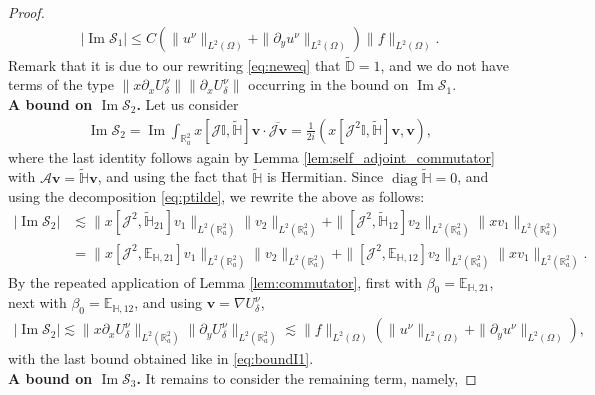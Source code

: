 \documentclass[10pt,a4paper]{amsart}
\renewcommand{\Im}{\operatorname{Im}}
\renewcommand{\vec}[1]{\mathbf{#1}}
\begin{document}
\begin{proof}
\begin{align}
	\label{eq:boundI1}
	\left|\Im \mathcal{S}_1\right|\leq C (\|u^{\nu}\|_{L^2(\Omega)}+\|\partial_y u^{\nu}\|_{L^2(\Omega)})\|f\|_{L^2(\Omega)}.
\end{align}
Remark that it is due to our rewriting \eqref{eq:neweq} that $\widetilde{\mathbb{D}}=1$, and we do not have terms of the type $\|x\partial_x U^{\nu}_{\delta}\|\|\partial_x U^{\nu}_{\delta}\|$ occurring in the bound on $\Im \mathcal{S}_1$.\\
\textbf{A bound on $\Im \mathcal{S}_2$. }
Let us consider
\begin{align}
	\label{eq:I2}
	\Im  \mathcal{S}_2=\operatorname{Im}\int_{\mathbb{R}^2_a}x[\mathcal{J}\mathbb{I}, \widetilde{\mathbb{H}}]\vec{v}\cdot\overline{\mathcal{J}\vec{v}}=\frac{1}{2i}
	\left(x[\mathcal{J}^2\mathbb{I}, \widetilde{\mathbb{H}}]\vec{v}, \vec{v}\right),
\end{align}
where the last identity follows again by Lemma \ref{lem:self_adjoint_commutator} with $\mathcal{A}\vec{v}=\widetilde{\mathbb{H}}\vec{v}$,  and using the fact that $\widetilde{\mathbb{H}}$ is Hermitian. 
Since $\operatorname{diag}\widetilde{\mathbb{H}}=0$, and using the decomposition \eqref{eq:ptilde}, we rewrite the above as follows:
\begin{align*}
	|\Im \mathcal{S}_2|&\lesssim \|x[\mathcal{J}^2, \widetilde{\mathbb{H}}_{21}]v_1\|_{L^2(\mathbb{R}^2_a)}\|v_2\|_{L^2(\mathbb{R}^2_a)}+\|[\mathcal{J}^2, \widetilde{\mathbb{H}}_{12}]v_2\|_{L^2(\mathbb{R}^2_a)}\|xv_1\|_{L^2(\mathbb{R}^2_a)}\\
	&=\|x[\mathcal{J}^2, \mathbb{E}_{\mathbb{H},21}]v_1\|_{L^2(\mathbb{R}^2_a)}\|v_2\|_{L^2(\mathbb{R}^2_a)}+\|[\mathcal{J}^2, \mathbb{E}_{\mathbb{H},12}]v_2\|_{L^2(\mathbb{R}^2_a)}\|xv_1\|_{L^2(\mathbb{R}^2_a)}.
\end{align*}
By the repeated application of Lemma \ref{lem:commutator}, first with $\beta_0=\mathbb{E}_{\mathbb{H},21}$, next with $\beta_0=\mathbb{E}_{\mathbb{H},12}$, and using $\vec{v}=\nabla U^{\nu}_{\delta}$,  
\begin{align}
	\label{eq:boundI2}
	|\Im \mathcal{S}_2|\lesssim \|x\partial_x U^{\nu}_{\delta}\|_{L^2(\mathbb{R}^2_a)}\|\partial_y U^{\nu}_{\delta}\|_{L^2(\mathbb{R}^2_a)}\lesssim \|f\|_{L^2(\Omega)}(\|u^{\nu}\|_{L^2(\Omega)}+\|\partial_y u^{\nu}\|_{L^2(\Omega)}),
\end{align}	
with the last bound obtained like in \eqref{eq:boundI1}.\\
\textbf{A bound on $\Im \mathcal{S}_3$. }It remains to consider the remaining term, namely,  

\end{proof}
\end{document}

